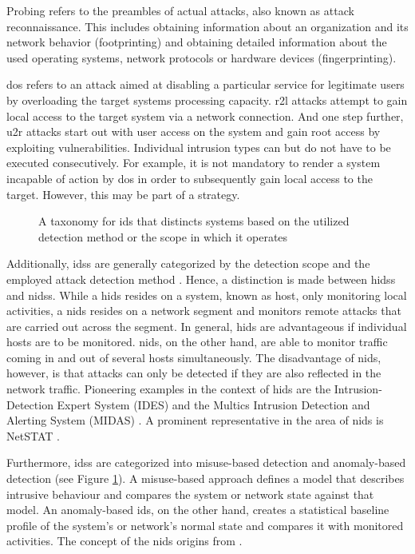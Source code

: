 \documentclass[../../../main.tex]{subfiles}
\begin{document}
Probing refers to the preambles of actual attacks, also known as attack reconnaissance. This includes obtaining information about an organization and its network behavior (footprinting) and obtaining detailed information about the used operating systems, network protocols or hardware devices (fingerprinting). 

\gls{dos} refers to an attack aimed at disabling a particular service for legitimate users by overloading the target systems processing capacity. \gls{r2l} attacks attempt to gain local access to the target system via a network connection. And one step further, \gls{u2r} attacks start out with user access on the system and gain root access by exploiting vulnerabilities. Individual intrusion types can but do not have to be executed consecutively. For example, it is not mandatory to render a system incapable of action by \gls{dos} in order to subsequently gain local access to the target. However, this may be part of a strategy.

\begin{figure}[b]
    \centering
    
    \caption{A taxonomy for \gls{ids} that distincts systems based on the utilized detection method or the  scope in which it operates}
    \label{fig:ids-taxonomy}
\end{figure}

Additionally, \glspl{ids} are generally categorized by the detection scope and the employed attack detection method \cite{milenkoski2015evaluating}. Hence, a distinction is made between \glspl{hids} and \glspl{nids}. While a \gls{hids} resides on a system, known as host, only monitoring local activities, a \gls{nids} resides on a network segment and monitors remote attacks that are carried out across the segment. In general, \gls{hids} are advantageous if individual hosts are to be monitored. \gls{nids}, on the other hand, are able to monitor traffic coming in and out of several hosts simultaneously. The disadvantage of \gls{nids}, however, is that attacks can only be detected if they are also reflected in the network traffic. Pioneering examples in the context of \gls{hids} are the Intrusion-Detection Expert System (IDES) \cite{lunt1992real} and the Multics Intrusion Detection and Alerting System (MIDAS) \cite{sebring1988expert}. A prominent representative in the area of \gls{nids} is NetSTAT \cite{vigna1998netstat} \cite{vigna1999netstat}.

Furthermore, \glspl{ids} are categorized into misuse-based detection and anomaly-based detection (see Figure \ref{fig:ids-taxonomy}). A misuse-based approach defines a model that describes intrusive behaviour and compares the system or network state against that model. An anomaly-based \gls{ids}, on the other hand, creates a statistical baseline profile of the system’s or network’s normal state and compares it with monitored activities. The concept of the \gls{nids} origins from \cite{denning1987intrusion}. 
\end{document}
